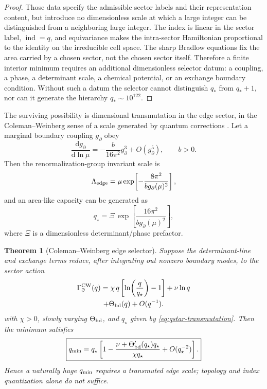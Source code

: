 \documentclass[aps,prd,reprint,nofootinbib,superscriptaddress,floatfix]{revtex4-2}
\numberwithin{equation}{section}
\theoremstyle{definition}
\theoremstyle{plain}
\newtheorem{theorem}{Theorem}[section]
\newcommand{\dd}{\mathrm d}
\begin{document}
\begin{proof}
Those data specify the admissible sector labels and their representation
content, but introduce no dimensionless scale at which a large integer
can be distinguished from a neighboring large integer.  The index is
linear in the sector label, \(\operatorname{ind}=q\), and equivariance
makes the intra-sector Hamiltonian proportional to the identity on the
irreducible cell space.  The sharp Bradlow equations fix the area carried
by a chosen sector, not the chosen sector itself.  Therefore a finite
interior minimum requires an additional dimensionless selector datum:
a coupling, a phase, a determinant scale, a chemical potential, or an
exchange boundary condition.  Without such a datum the selector cannot
distinguish \(q_*\) from \(q_*+1\), nor can it generate the hierarchy
\(q_*\sim10^{122}\).
\end{proof}

The surviving possibility is dimensional transmutation in the edge
sector, in the Coleman--Weinberg sense of a scale generated by quantum
corrections \cite{ColemanWeinberg1973}.  Let a marginal boundary coupling \(g_\partial\) obey
\begin{equation}
\frac{\dd g_\partial}{\dd\ln\mu}
=
-\frac{b}{16\pi^2}g_\partial^3+O(g_\partial^5),
\qquad b>0 .
\end{equation}
Then the renormalization-group invariant scale is
\begin{equation}
\Lambda_{\rm edge}
=
\mu\exp\!\left[-\frac{8\pi^2}{b g_\partial(\mu)^2}\right],
\end{equation}
and an area-like capacity can be generated as
\begin{equation}
\boxed{
q_\star
=
\Xi\,
\exp\!\left[\frac{16\pi^2}{b g_\partial(\mu)^2}\right],
}
\label{eq:qstar-transmutation}
\end{equation}
where \(\Xi\) is a dimensionless determinant/phase prefactor.

\begin{theorem}[Coleman--Weinberg edge selector]
\label{thm:cw-edge-selector}
Suppose the determinant-line and exchange terms reduce, after integrating
out nonzero boundary modes, to the sector action
\begin{multline}
\Gamma_\partial^{\rm CW}(q)
=
\chi\,q\left[\ln\!\left(\frac{q}{q_\star}\right)-1\right]
+\nu\ln q
\\
+\Theta_{\rm bd}(q)+O(q^{-1}).
\end{multline}
with \(\chi>0\), slowly varying \(\Theta_{\rm bd}\), and \(q_\star\) given
by \cref{eq:qstar-transmutation}.  Then the minimum satisfies
\begin{equation}
\boxed{
q_{\rm min}
=
q_\star
\left[
1-\frac{\nu+\Theta'_{\rm bd}(q_\star)q_\star}{\chi q_\star}
+O(q_\star^{-2})
\right].
}
\end{equation}
Hence a naturally huge \(q_{\rm min}\) requires a transmuted edge scale;
topology and index quantization alone do not suffice.
\end{theorem}
\end{document}
